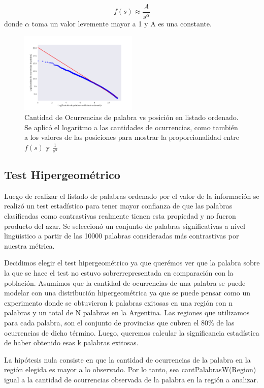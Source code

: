 $$f(s) \approx \frac{A}{s^{\alpha}}$$
donde $\alpha$ toma un valor levemente mayor a 1 y A es una constante.

\begin{figure}[ht]
\centering
\includegraphics[width=0.5\textwidth]{./images/zipf.pdf}
\caption{Cantidad de Ocurrencias de palabra vs posición en listado ordenado. Se aplicó el logaritmo a las cantidades de ocurrencias, como también a los valores de las posiciones para mostrar la proporcionalidad entre $f(s)$ y $\frac{1}{s^{\alpha}}$} 
\label{fig:zipf} 
\end{figure}


\subsection{Test Hipergeométrico}
Luego de realizar el listado de palabras ordenado por el valor de la información se realizó un test estadístico para tener mayor confianza de que las palabras clasificadas como contrastivas realmente tienen esta propiedad y no fueron producto del azar. Se seleccionó un conjunto de palabras significativas a nivel lingüistico a partir de las 10000 palabras consideradas más contrastivas por nuestra métrica. 

Decidimos elegir el test hipergeométrico ya que querémos ver que la palabra sobre la que se hace el test no estuvo sobrerrepresentada en comparación con la población. Asumimos que la cantidad de ocurrencias de una palabra se puede modelar con una distribución hipergeométrica ya que se puede pensar como un experimento donde se obtuvieron k palabras exitosas en una región con n palabras y un total de N palabras en la Argentina. Las regiones que utilizamos para cada palabra, son el conjunto de provincias que cubren el 80\% de las ocurrencias de dicho término. Luego, queremos calcular la significancia estadística de haber obtenido esas k palabras exitosas.



La hipótesis nula consiste en que la cantidad de ocurrencias de la palabra en la región elegida es mayor a lo observado. 
Por lo tanto, sea  cantPalabrasW(Region) igual a la cantidad de ocurrencias observada de la palabra en la región a analizar.


